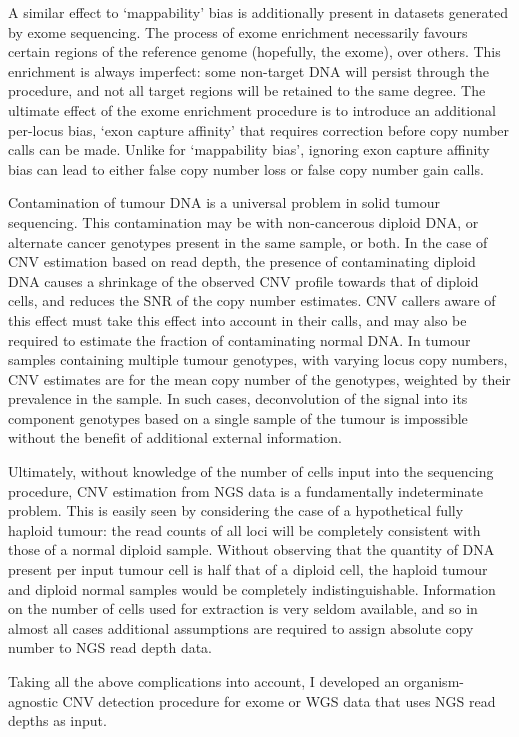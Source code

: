 \documentclass[thesis.tex]{subfiles}
\begin{document}
A similar effect to `mappability' bias is additionally present in datasets generated by exome sequencing.  The process of exome enrichment necessarily favours certain regions of the reference genome (hopefully, the exome), over others.  This enrichment is always imperfect: some non-target DNA will persist through the procedure, and not all target regions will be retained to the same degree.  The ultimate effect of the exome enrichment procedure is to introduce an additional per-locus bias, `exon capture affinity' that requires correction before copy number calls can be made.  Unlike for `mappability bias', ignoring exon capture affinity bias can lead to either false copy number loss or false copy number gain calls.

Contamination of tumour DNA is a universal problem in solid tumour sequencing.  This contamination may be with non-cancerous diploid DNA, or alternate cancer genotypes present in the same sample, or both.  In the case of \gls{CNV} estimation based on read depth, the presence of contaminating diploid DNA causes a shrinkage of the observed \gls{CNV} profile towards that of diploid cells, and reduces the \gls{SNR} of the copy number estimates.  \gls{CNV} callers aware of this effect must take this effect into account in their calls, and may also be required to estimate the fraction of contaminating normal DNA.  In tumour samples containing multiple tumour genotypes, with varying locus copy numbers, \gls{CNV} estimates are for the mean copy number of the genotypes, weighted by their prevalence in the sample.  In such cases, deconvolution of the signal into its component genotypes based on a single sample of the tumour is impossible without the benefit of additional external information.

Ultimately, without knowledge of the number of cells input into the sequencing procedure, \gls{CNV} estimation from \gls{NGS} data is a fundamentally indeterminate problem.  This is easily seen by considering the case of a hypothetical fully haploid tumour: the read counts of all loci will be completely consistent with those of a normal diploid sample.  Without observing that the quantity of DNA present per input tumour cell is half that of a diploid cell, the haploid tumour and diploid normal samples would be completely indistinguishable.  Information on the number of cells used for extraction is very seldom available, and so in almost all cases additional assumptions are required to assign absolute copy number to \gls{NGS} read depth data.

Taking all the above complications into account, I developed an organism-agnostic \gls{CNV} detection procedure for exome or \gls{WGS} data that uses \gls{NGS} read depths as input.  
\end{document}
